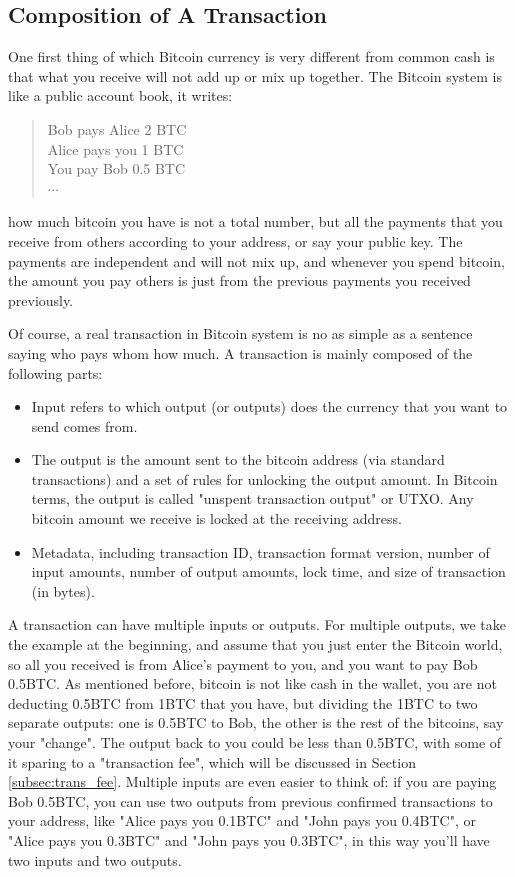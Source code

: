 \documentclass[12pt,a4paper]{article}
\begin{document}
\subsection{Composition of A Transaction}
One first thing of which Bitcoin currency is very different from common cash is that what you receive will not add up or mix up together. The Bitcoin system is like a public account book, it writes:
\begin{quote}
Bob pays Alice 2 BTC \\
Alice pays you 1 BTC\\
You pay Bob 0.5 BTC\\
$\cdots$
\end{quote}
how much bitcoin you have is not a total number, but all the payments that you receive from others according to your address, or say your public key. The payments are independent and will not mix up, and whenever you spend bitcoin, the amount you pay others is just from the previous payments you received previously. 

Of course, a real transaction in Bitcoin system is no as simple as a sentence saying who pays whom how much. A transaction is mainly composed of the following parts:
\begin{itemize}
	\item Input refers to which output (or outputs) does the currency that you want to send comes from.
	\item The output is the amount sent to the bitcoin address (via standard transactions) and a set of rules for unlocking the output amount. In Bitcoin terms, the output is called "unspent transaction output" or UTXO. Any bitcoin amount we receive is locked at the receiving address.
	\item Metadata, including transaction ID, transaction format version, number of input amounts, number of output amounts, lock time, and size of transaction (in bytes).
\end{itemize}

A transaction can have multiple inputs or outputs. For multiple outputs, we take the example at the beginning, and assume that you just enter the Bitcoin world, so all you received is from Alice's payment to you, and you want to pay Bob 0.5BTC. As mentioned before, bitcoin is not like cash in the wallet, you are not deducting 0.5BTC from 1BTC that you have, but dividing the 1BTC to two separate outputs: one is 0.5BTC to Bob, the other is the rest of the bitcoins, say your "change". The output back to you could be less than 0.5BTC, with some of it sparing to a "transaction fee", which will be discussed in Section \ref{subsec:trans_fee}. Multiple inputs are even easier to think of: if you are paying Bob 0.5BTC, you can use two outputs from previous confirmed transactions to your address, like "Alice pays you 0.1BTC" and "John pays you 0.4BTC", or "Alice pays you 0.3BTC" and "John pays you 0.3BTC", in this way you'll have two inputs and two outputs.
\end{document}

